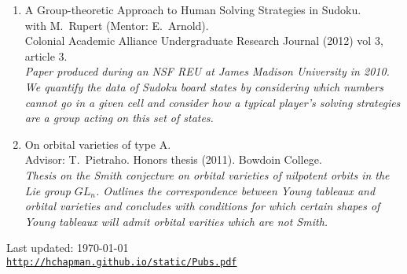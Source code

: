 \documentclass[letterpaper]{article}
\def\footerlink{http://hchapman.github.io/static/Pubs.pdf}
\begin{document}
\begin{enumerate}
\item A Group-theoretic Approach to Human Solving Strategies in
  Sudoku.\\
  with M.\ Rupert (Mentor: E.\ Arnold). \\
  Colonial Academic Alliance Undergraduate Research Journal (2012) vol
  3, article 3.\\
  \textit{Paper produced during an NSF REU at James Madison University
    in 2010. We quantify the data of Sudoku board states by
    considering which numbers \emph{cannot} go in a given cell and
    consider how a typical player's solving strategies are a group
    acting on this set of states.}
\item On orbital varieties of type A. \\
  Advisor: T.\ Pietraho. Honors thesis (2011). Bowdoin
  College. \\
  \textit{Thesis on the Smith conjecture on orbital varieties of
    nilpotent orbits in the Lie group $GL_n$.  Outlines the
    correspondence between Young tableaux and orbital varieties and
    concludes with conditions for which certain shapes of Young
    tableaux will admit orbital varities which are not Smith.}
\end{enumerate}

\bigskip

\begin{center}
  \begin{footnotesize}
    Last updated: \today \\
    \href{\footerlink}{\texttt{\footerlink}}
  \end{footnotesize}
\end{center}
\end{document}
